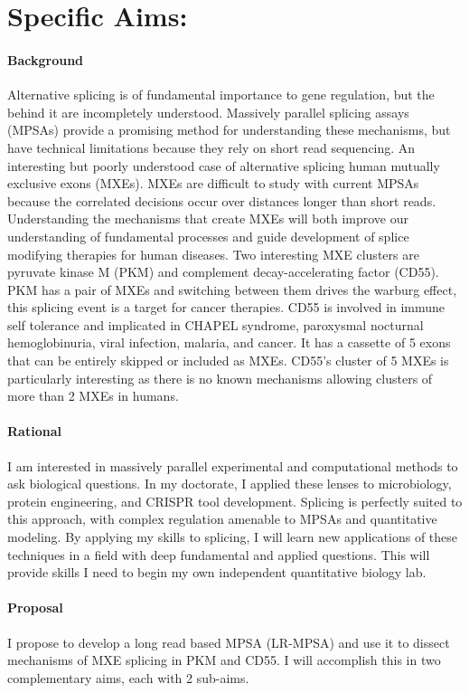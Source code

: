 \documentclass[11pt]{article}
\begin{document}
\section*{Specific Aims:}
\paragraph{Background}
Alternative splicing is of fundamental importance to gene regulation, but the behind it are incompletely understood.
Massively parallel splicing assays (MPSAs) provide a promising method for understanding these mechanisms, but have technical limitations because they rely on short read sequencing.
An interesting but poorly understood case of alternative splicing human mutually exclusive exons (MXEs).
MXEs are difficult to study with current MPSAs because the correlated decisions occur over distances longer than short reads.
Understanding the mechanisms that create MXEs will both improve our understanding of fundamental processes and guide development of splice modifying therapies for human diseases.
Two interesting MXE clusters are pyruvate kinase M (PKM) and complement decay-accelerating factor (CD55).
PKM has a pair of MXEs and switching between them drives the warburg effect, this splicing event is a target for cancer therapies.
CD55 is involved in immune self tolerance and implicated in CHAPEL syndrome, paroxysmal nocturnal hemoglobinuria, viral infection, malaria, and cancer. 
It has a cassette of 5 exons that can be entirely skipped or included as MXEs.
CD55's cluster of 5 MXEs is particularly interesting as there is no known mechanisms allowing clusters of more than 2 MXEs in humans.
%
\paragraph{Rational}
I am interested in massively parallel experimental and computational methods to ask biological questions.
In my doctorate, I applied these lenses to microbiology, protein engineering, and CRISPR tool development.
Splicing is perfectly suited to this approach, with complex regulation amenable to MPSAs and quantitative modeling.
By applying my skills to splicing, I will learn new applications of these techniques in a field with deep fundamental and applied questions.
This will provide skills I need to begin my own independent quantitative biology lab.
%
\paragraph{Proposal}
I propose to develop a long read based MPSA (LR-MPSA) and use it to dissect mechanisms of MXE splicing in PKM and CD55.
I will accomplish this in two complementary aims, each with 2 sub-aims.
\end{document}
